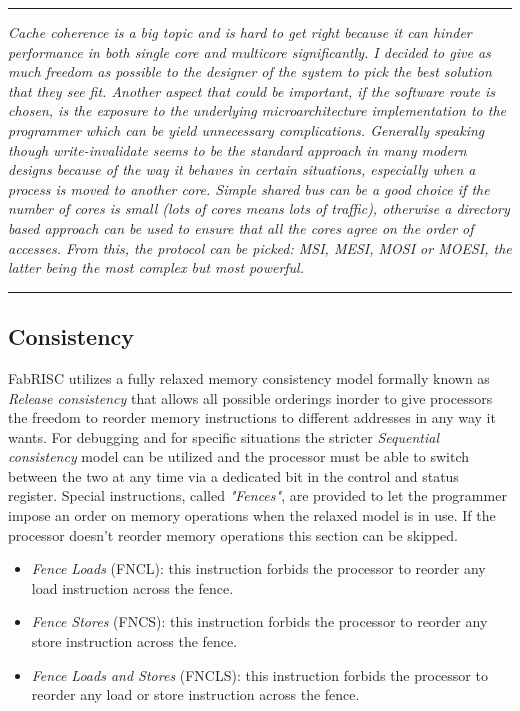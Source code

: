 \documentclass{article}
\begin{document}
        \par\noindent\rule{\textwidth}{0.4pt}
        \textit{Cache coherence is a big topic and is hard to get right because it can hinder performance in both single core and multicore significantly. I decided to give as much freedom as possible to the designer of the system to pick the best solution that they see fit. Another aspect that could be important, if the software route is chosen, is the exposure to the underlying microarchitecture implementation to the programmer which can be yield unnecessary complications. Generally speaking though write-invalidate seems to be the standard approach in many modern designs because of the way it behaves in certain situations, especially when a process is moved to another core. Simple shared bus can be a good choice if the number of cores is small (lots of cores means lots of traffic), otherwise a directory based approach can be used to ensure that all the cores agree on the order of accesses. From this, the protocol can be picked: MSI, MESI, MOSI or MOESI, the latter being the most complex but most powerful.}
        \par\noindent\rule{\textwidth}{0.4pt}

        \subsection{Consistency}

            FabRISC utilizes a fully relaxed memory consistency model formally known as \textit{Release consistency} that allows all possible orderings inorder to give processors the freedom to reorder memory instructions to different addresses in any way it wants. For debugging and for specific situations the stricter \textit{Sequential consistency} model can be utilized and the processor must be able to switch between the two at any time via a dedicated bit in the control and status register. Special instructions, called \textit{"Fences"}, are provided to let the programmer impose an order on memory operations when the relaxed model is in use. If the processor doesn't reorder memory operations this section can be skipped.

            \begin{itemize}

                \item \textit{Fence Loads} (FNCL): this instruction forbids the processor to reorder any load instruction across the fence.
                \item \textit{Fence Stores} (FNCS): this instruction forbids the processor to reorder any store instruction across the fence.
                \item \textit{Fence Loads and Stores} (FNCLS): this instruction forbids the processor to reorder any load or store instruction across the fence.

            \end{itemize}
\end{document}
